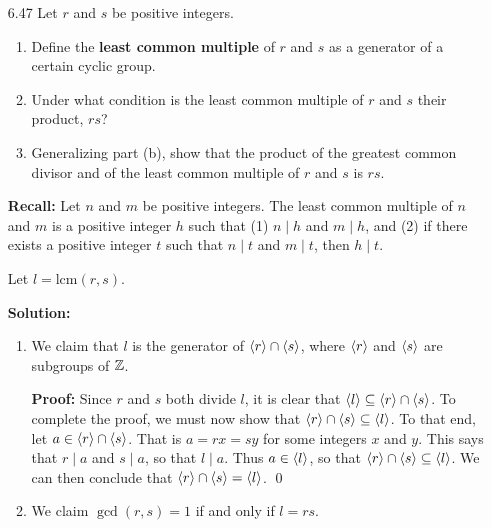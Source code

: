 \begin{enumerate}
      \textbf{Proof:} Let $a$ and $b$ be elements of a group $G$, and let $e$ be
      the identity of $G$. Suppose $|ab| = n$. We want to show that $|ba| = n$.
      So first we must show that $(ba)^n = e$. We can show by induction that
      $(ba)^n = b(ab)^{n - 1}a$. Hence $(ba)^{n + 1} = b(ab)^na = ba$. We have
      shown that $(ba)(ba)^n = ba$, so that $ba = e$ by the Cancellation Law.
      Now suppose $(ba)^m = e$ for some positive $m < n$. Then we must also have
      that $(ab)^{m + 1} = a(ba)^mb = ab$, so that $(ab)^m = e$, a
      contradiction. Thus $|ba| = n$. \qed
   \item[6.47] Let $r$ and $s$ be positive integers.
               \begin{enumerate}
                  \item Define the \textbf{least common multiple} of $r$ and
                        $s$ as a generator of a certain cyclic group.
                  \item Under what condition is the least common multiple of $r$
                        and $s$ their product, $rs$?
                  \item Generalizing part (b), show that the product of the
                        greatest common divisor and of the least common multiple
                        of $r$ and $s$ is $rs$.
               \end{enumerate}

      \textbf{Recall:} Let $n$ and $m$ be positive integers. The least common
      multiple of $n$ and $m$ is a positive integer $h$ such that (1) $n \mid h$ 
      and $m \mid h$, and (2) if there exists a positive integer $t$ such that
      $n \mid t$ and $m \mid t$, then $h \mid t$.

      Let $l = \text{lcm}(r, s)$.

      \textbf{Solution:}
      
      \begin{enumerate}
         \item We claim that $l$ is the generator of $\langle r \rangle \cap \langle s \rangle$, 
               where $\langle r \rangle$ and $\langle s \rangle$ are subgroups of $\mathbb{Z}$.

               \textbf{Proof:} Since $r$ and $s$ both divide $l$, it is clear
               that $\langle l \rangle \subseteq \langle r \rangle \cap \langle s \rangle$. To complete the
               proof, we must now show that
               $\langle r \rangle \cap \langle s \rangle \subseteq \langle l \rangle$. To that end, let
               $a \in \langle r \rangle \cap \langle s \rangle$. That is $a = rx = sy$ for some
               integers $x$ and $y$. This says that $r \mid a$ and $s \mid a$,
               so that $l \mid a$. Thus $a \in \langle l \rangle$, so that
               $\langle r \rangle \cap \langle s \rangle \subseteq \langle l \rangle$. We can then conclude
               that $\langle r \rangle \cap \langle s \rangle = \langle l \rangle$. \qed
         \item We claim $\gcd(r, s) = 1$ if and only if $l = rs$.


\end{enumerate}
\end{enumerate}
